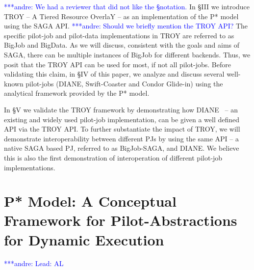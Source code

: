 \documentclass[conference,final]{IEEEtran}
\newcommand{\jhanote}[1]{ {\textcolor{red} { ***shantenu: #1 }}}
\newcommand{\alnote}[1]{ {\textcolor{blue} { ***andre: #1 }}}
\newcommand{\alnote}[1]{}
\newcommand{\jhanote}[1]{}
\newcommand{\upp}{\vspace*{-0.5em}}
\begin{document}
\alnote{We had a reviewer that did not like the \S notation.}  In \S{III}
we introduce TROY -- A Tiered Resource OverlaY -- as an implementation
of the P* model using the SAGA API. \alnote{Should we briefly mention
  the TROY API?} The specific pilot-job and pilot-data implementations
in TROY are referred to as BigJob and BigData. As we will discuss,
consistent with the goals and aims of SAGA, there can be
multiple %
instances of BigJob for different backends.  Thus, we posit that the
TROY API %
can be used for most, if not all pilot-jobs. Before validating this
claim, in \S{IV} of this paper, we analyze and discuss several well-known
pilot-jobs (DIANE, Swift-Coaster and Condor Glide-in) using the
analytical framework provided by the P* model.


In \S{V} we validate the TROY framework by demonstrating how
DIANE~\cite{Moscicki:908910} -- an existing and widely used pilot-job
implementation, can be given a well defined API via the TROY API. To
further substantiate the impact of TROY, we will demonstrate
interoperability between different PJs by using the same API -- a
native SAGA based PJ, referred to as BigJob-SAGA, and DIANE. We
believe this is also the first demonstration of interoperation of
different pilot-job implementations.





\section{P* Model: A Conceptual Framework for Pilot-Abstractions for
  Dynamic Execution \upp\upp}
\alnote{Lead: AL}
\label{sec:pilot-model}
\end{document}
